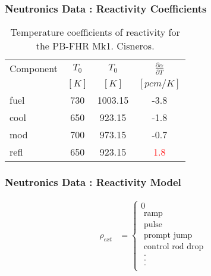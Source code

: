 \begin{frame}[fragile]
  \frametitle{Neutronics Data : Reactivity Coefficients}
    \begin{table}
      \begin{tabular}{|l|c|c|c|}
        \hline
        Component & $T_{0}$  &  $T_0$ & $\frac{\partial\alpha}{\partial T}$\\
                  & $[K]$    &  $[K]$ & $[pcm/K]$ \\
        \hline
        fuel  & 730 & 1003.15 & -3.8 \\
        cool  & 650 &  923.15 & -1.8 \\
        mod   & 700 &  973.15 & -0.7 \\
        refl  & 650 &  923.15 &  \textcolor{red}{1.8} \\
        \hline
      \end{tabular}
      \caption{Temperature coefficients of reactivity for the PB-FHR Mk1. 
      Cisneros.}
      \label{tab:decayheat}
    \end{table}

\end{frame}


\begin{frame}[fragile]
  \frametitle{Neutronics Data : Reactivity Model}
  \begin{align}
    \rho_{ext} &= \left\{
                  \begin{array}{l}
                            0 \\
                            \mbox{ ramp } \\
                            \mbox{ pulse } \\
                            \mbox{ prompt jump }\\
                            \mbox{ control rod drop }\\
                            \mbox{ . } \\
                            \mbox{ . } \\
                            \mbox{ . } \\
                  \end{array}
                  \right.
  \end{align}
\end{frame}



